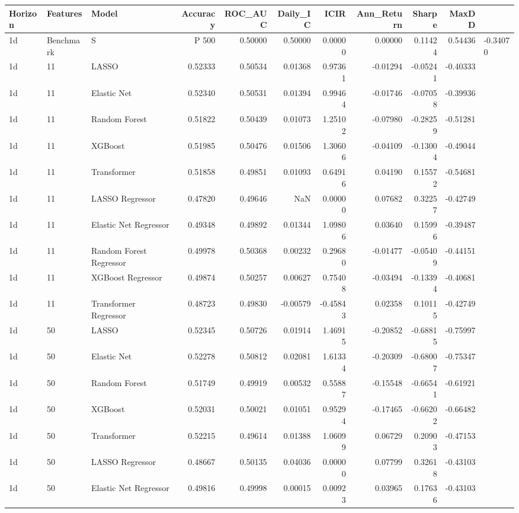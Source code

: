 \begin{tabular}{lllrrrrrrr}
\toprule
Horizon & Features & Model & Accuracy & ROC_AUC & Daily_IC & ICIR & Ann_Return & Sharpe & MaxDD \\
\midrule
1d & Benchmark & S&P 500 & 0.50000 & 0.50000 & 0.00000 & 0.00000 & 0.11424 & 0.54436 & -0.34070 \\
1d & 11 & LASSO & 0.52333 & 0.50534 & 0.01368 & 0.97361 & -0.01294 & -0.05241 & -0.40333 \\
1d & 11 & Elastic Net & 0.52340 & 0.50531 & 0.01394 & 0.99464 & -0.01746 & -0.07058 & -0.39936 \\
1d & 11 & Random Forest & 0.51822 & 0.50439 & 0.01073 & 1.25102 & -0.07980 & -0.28259 & -0.51281 \\
1d & 11 & XGBoost & 0.51985 & 0.50476 & 0.01506 & 1.30606 & -0.04109 & -0.13004 & -0.49044 \\
1d & 11 & Transformer & 0.51858 & 0.49851 & 0.01093 & 0.64916 & 0.04190 & 0.15572 & -0.54681 \\
1d & 11 & LASSO Regressor & 0.47820 & 0.49646 & NaN & 0.00000 & 0.07682 & 0.32257 & -0.42749 \\
1d & 11 & Elastic Net Regressor & 0.49348 & 0.49892 & 0.01344 & 1.09806 & 0.03640 & 0.15996 & -0.39487 \\
1d & 11 & Random Forest Regressor & 0.49978 & 0.50368 & 0.00232 & 0.29680 & -0.01477 & -0.05409 & -0.44151 \\
1d & 11 & XGBoost Regressor & 0.49874 & 0.50257 & 0.00627 & 0.75408 & -0.03494 & -0.13394 & -0.40681 \\
1d & 11 & Transformer Regressor & 0.48723 & 0.49830 & -0.00579 & -0.45843 & 0.02358 & 0.10115 & -0.42749 \\
1d & 50 & LASSO & 0.52345 & 0.50726 & 0.01914 & 1.46915 & -0.20852 & -0.68815 & -0.75997 \\
1d & 50 & Elastic Net & 0.52278 & 0.50812 & 0.02081 & 1.61334 & -0.20309 & -0.68007 & -0.75347 \\
1d & 50 & Random Forest & 0.51749 & 0.49919 & 0.00532 & 0.55887 & -0.15548 & -0.66541 & -0.61921 \\
1d & 50 & XGBoost & 0.52031 & 0.50021 & 0.01051 & 0.95294 & -0.17465 & -0.66202 & -0.66482 \\
1d & 50 & Transformer & 0.52215 & 0.49614 & 0.01388 & 1.06099 & 0.06729 & 0.20903 & -0.47153 \\
1d & 50 & LASSO Regressor & 0.48667 & 0.50135 & 0.04036 & 0.00000 & 0.07799 & 0.32618 & -0.43103 \\
1d & 50 & Elastic Net Regressor & 0.49816 & 0.49998 & 0.00015 & 0.00923 & 0.03965 & 0.17636 & -0.43103 \\

\end{tabular}
